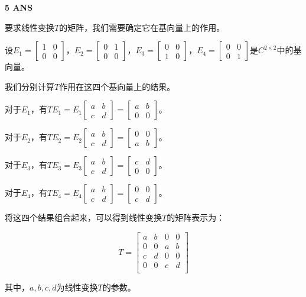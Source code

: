 \documentclass[11pt,letterpaper]{ctexart}
\begin{document}
\textbf{5 ANS}
\bigskip

要求线性变换$T$的矩阵，我们需要确定它在基向量上的作用。

设$E_1=\begin{bmatrix} 1 & 0 \\ 0 & 0 \end{bmatrix}$，$E_2=\begin{bmatrix} 0 & 1 \\ 0 & 0 \end{bmatrix}$，$E_3=\begin{bmatrix} 0 & 0 \\ 1 & 0 \end{bmatrix}$，$E_4=\begin{bmatrix} 0 & 0 \\ 0 & 1 \end{bmatrix}$是$C_{}^{2 \times 2}$中的基向量。

我们分别计算$T$作用在这四个基向量上的结果。

对于$E_1$，有$TE_1=E_1\begin{bmatrix} a & b \\ c & d \end{bmatrix}=\begin{bmatrix} a & b \\ 0 & 0 \end{bmatrix}$。

对于$E_2$，有$TE_2=E_2\begin{bmatrix} a & b \\ c & d \end{bmatrix}=\begin{bmatrix} 0 & 0 \\ a & b \end{bmatrix}$。

对于$E_3$，有$TE_3=E_3\begin{bmatrix} a & b \\ c & d \end{bmatrix}=\begin{bmatrix} c & d \\ 0 & 0 \end{bmatrix}$。

对于$E_4$，有$TE_4=E_4\begin{bmatrix} a & b \\ c & d \end{bmatrix}=\begin{bmatrix} 0 & 0 \\ c & d \end{bmatrix}$。

将这四个结果组合起来，可以得到线性变换$T$的矩阵表示为：

$$
T = \begin{bmatrix}
a & b & 0 & 0 \\
0 & 0 & a & b \\
c & d & 0 & 0 \\
0 & 0 & c & d \\
\end{bmatrix}
$$

其中，$a, b, c, d$为线性变换$T$的参数。
\end{document}
